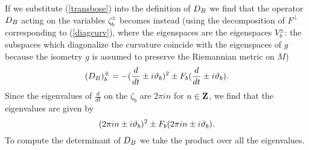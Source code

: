 \documentclass[12pt]{article}
\newcommand{\labell}[1] {\label{#1}}
\begin{document}
If we substitute (\ref{transbose}) into the definition of ${D_B}$ 
we find that the operator ${D_B}$ acting on the 
variables $ \zeta^\pm_b$ becomes instead (using  the decomposition
of $F^\perp$ corresponding to 
(\ref{diagcurv}), where the eigenspaces are the eigenspaces
$V_b^\pm$: the subspaces which diagonalize the curvature coincide
with the eigenspaces of $g$ because the isometry $g$ is assumed to 
preserve the Riemannian metric on $M$)
\begin{equation} \labell{bosop}
(\opbose)^\pm_b = -  (\frac{d}{dt} \pm i \eig_b)^2 
\pm  F_b (\frac{d}{dt} \pm i \eig_b). 
\end{equation}
Since the eigenvalues of $\frac{d}{dt}$ on the 
$\zeta_b$ are $2 \pi i n$ for $n \in {\mathbf{Z}}$, we find that the eigenvalues
are given by 
\begin{equation} \labell{eigval}
(2 \pi i n \pm i \eig_b)^2 \pm F_b (2 \pi i n \pm i \eig_b). 
\end{equation}
To compute the determinant of ${D_B}$ we take the product over all
the eigenvalues.
\end{document}
